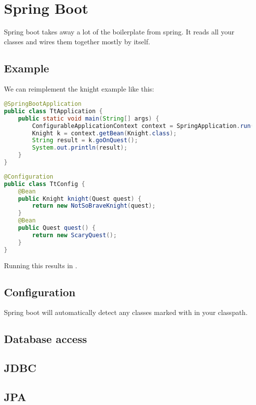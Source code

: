 \section{Spring Boot}

Spring boot takes away a lot of the boilerplate from spring. It reads all your classes and wires them together mostly by itself.


\subsection{Example}
We can reimplement the knight example like this: 

\begin{lstlisting}[language=java, title=TtAplication]
@SpringBootApplication
public class TtApplication {
	public static void main(String[] args) {
		ConfigurableApplicationContext context = SpringApplication.run(TtApplication.class, args);
		Knight k = context.getBean(Knight.class);
		String result = k.goOnQuest();
		System.out.println(result);
	}
}
\end{lstlisting}

\begin{lstlisting}[language=java, title=TtConfig]
@Configuration
public class TtConfig {
	@Bean
	public Knight knight(Quest quest) {
		return new NotSoBraveKnight(quest);
	}
	@Bean 
	public Quest quest() {
		return new ScaryQuest();
	}
}
\end{lstlisting}

Running this results in .



\subsection{Configuration}
Spring boot will automatically detect any classes marked with   in your classpath.




\subsection{Database access}

\subsection{JDBC}

\subsection{JPA}

